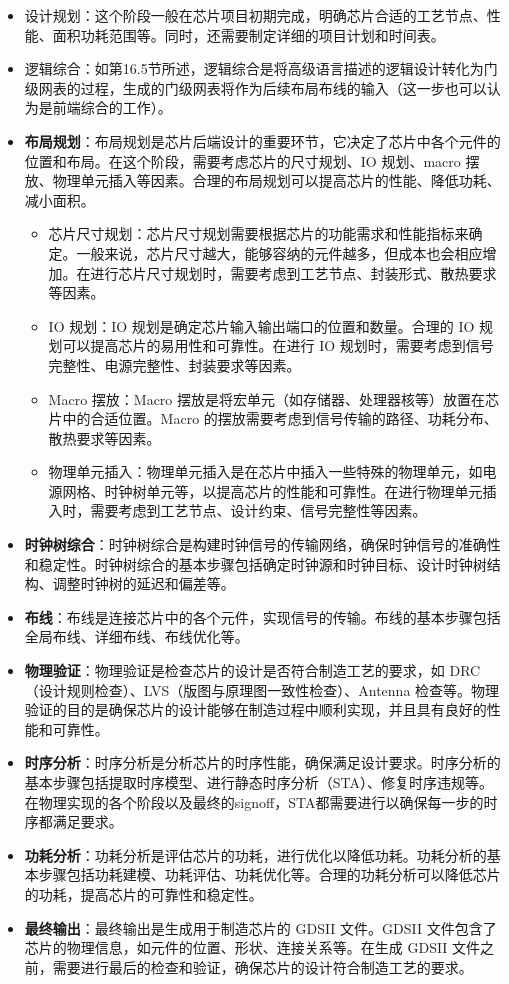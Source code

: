 \begin{itemize}
\tightlist
\item
  设计规划：这个阶段一般在芯片项目初期完成，明确芯片合适的工艺节点、性能、面积功耗范围等。同时，还需要制定详细的项目计划和时间表。
\item
  逻辑综合：如第16.5节所述，逻辑综合是将高级语言描述的逻辑设计转化为门级网表的过程，生成的门级网表将作为后续布局布线的输入（这一步也可以认为是前端综合的工作）。
\item
  \textbf{布局规划}：布局规划是芯片后端设计的重要环节，它决定了芯片中各个元件的位置和布局。在这个阶段，需要考虑芯片的尺寸规划、IO 规划、macro 摆放、物理单元插入等因素。合理的布局规划可以提高芯片的性能、降低功耗、减小面积。

  \begin{itemize}
  \tightlist
  \item
    芯片尺寸规划：芯片尺寸规划需要根据芯片的功能需求和性能指标来确定。一般来说，芯片尺寸越大，能够容纳的元件越多，但成本也会相应增加。在进行芯片尺寸规划时，需要考虑到工艺节点、封装形式、散热要求等因素。
  \item
    IO 规划：IO 规划是确定芯片输入输出端口的位置和数量。合理的 IO 规划可以提高芯片的易用性和可靠性。在进行 IO 规划时，需要考虑到信号完整性、电源完整性、封装要求等因素。
  \item
    Macro 摆放：Macro 摆放是将宏单元（如存储器、处理器核等）放置在芯片中的合适位置。Macro 的摆放需要考虑到信号传输的路径、功耗分布、散热要求等因素。
  \item
    物理单元插入：物理单元插入是在芯片中插入一些特殊的物理单元，如电源网格、时钟树单元等，以提高芯片的性能和可靠性。在进行物理单元插入时，需要考虑到工艺节点、设计约束、信号完整性等因素。
  \end{itemize}
\item
  \textbf{时钟树综合}：时钟树综合是构建时钟信号的传输网络，确保时钟信号的准确性和稳定性。时钟树综合的基本步骤包括确定时钟源和时钟目标、设计时钟树结构、调整时钟树的延迟和偏差等。
\item
  \textbf{布线}：布线是连接芯片中的各个元件，实现信号的传输。布线的基本步骤包括全局布线、详细布线、布线优化等。
\item
  \textbf{物理验证}：物理验证是检查芯片的设计是否符合制造工艺的要求，如 DRC（设计规则检查）、LVS（版图与原理图一致性检查）、Antenna 检查等。物理验证的目的是确保芯片的设计能够在制造过程中顺利实现，并且具有良好的性能和可靠性。
\item
  \textbf{时序分析}：时序分析是分析芯片的时序性能，确保满足设计要求。时序分析的基本步骤包括提取时序模型、进行静态时序分析（STA）、修复时序违规等。在物理实现的各个阶段以及最终的signoff，STA都需要进行以确保每一步的时序都满足要求。
\item
  \textbf{功耗分析}：功耗分析是评估芯片的功耗，进行优化以降低功耗。功耗分析的基本步骤包括功耗建模、功耗评估、功耗优化等。合理的功耗分析可以降低芯片的功耗，提高芯片的可靠性和稳定性。
\item
  \textbf{最终输出}：最终输出是生成用于制造芯片的 GDSII 文件。GDSII 文件包含了芯片的物理信息，如元件的位置、形状、连接关系等。在生成 GDSII 文件之前，需要进行最后的检查和验证，确保芯片的设计符合制造工艺的要求。
\end{itemize}


